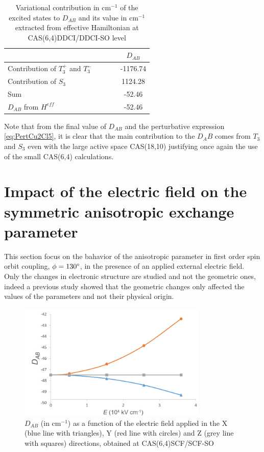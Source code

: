 \documentclass[10pt]{report}
\numberwithin{equation}{section}
\begin{document}
\begin{table}
    \centering
    \begin{tabular}{l c c}
        \hline
        \hline
         & $\qquad$&$D_{AB}$\\
         \hline
         Contribution of $T_3^+$ and $T_3^-$& $\qquad$& -1176.74 \\
         Contribution of $S_3$& $\qquad$& 1124.28\\
         Sum &$\qquad$ &-52.46\\
         $D_{AB}$ from $H^{eff}$ & $\qquad$ &-52.46\\
         \hline
         \hline
    \end{tabular}
    \caption{Variational contribution in cm$^{-1}$ of the excited states to $D_{AB}$ and its value in cm$^{-1}$ extracted from effective Hamiltonian at CAS(6,4)DDCI/DDCI-SO level}
    \label{ContE0}
\end{table}

Note that from the final value of $D_{AB}$ and the perturbative expression \ref{eq:PertCu2Cl5}, it is clear that the main contribution to the $D_AB$ comes from $T_3$ and $S_3$ even with the large active space CAS(18,10) justifying once again the use of the small CAS(6,4) calculations.


\section{Impact of the electric field on the symmetric anisotropic exchange parameter}

This section focus on the bahavior of the anisotropic parameter in first order spin orbit coupling, $\phi=130\degree$, in the presence of an applied external electric field.
Only the changes in electronic structure are studied and not the geometric ones, indeed a previous study showed that the geometric changes only affected the values of the parameters and not their physical origin. 

\begin{figure}[!h]
    \centering
    \includegraphics[width=0.8\textwidth]{Images/D_AB_E.png}
    \caption{$D_{AB}$ (in cm$^{-1}$) as a function of the electric field applied in the X (blue line with triangles), Y (red line with circles) and Z (grey line with squares) directions, obtained at CAS(6,4)SCF/SCF-SO}
    \label{DABchamp}
\end{figure}
\end{document}
